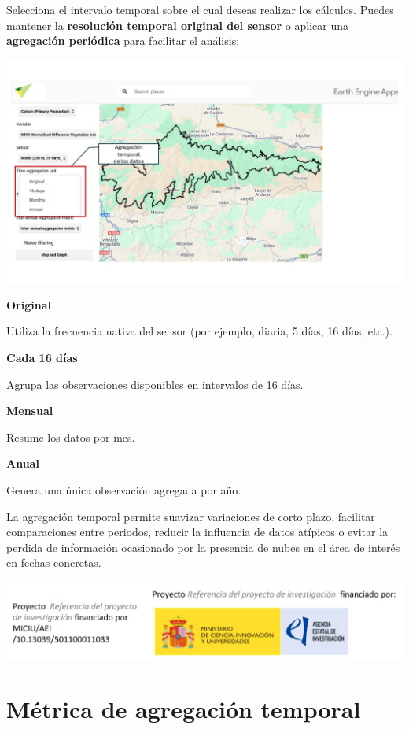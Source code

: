 \documentclass[
]{book}
\begin{document}
Selecciona el intervalo temporal sobre el cual deseas realizar los cálculos. Puedes mantener la \textbf{resolución temporal original del sensor} o aplicar una \textbf{agregación periódica} para facilitar el análisis:

\includegraphics{assets/aggregation_es.png}

\textbf{Original}

Utiliza la frecuencia nativa del sensor (por ejemplo, diaria, 5 días, 16 días, etc.).

\textbf{Cada 16 días}

Agrupa las observaciones disponibles en intervalos de 16 días.

\textbf{Mensual}

Resume los datos por mes.

\textbf{Anual}

Genera una única observación agregada por año.

La agregación temporal permite suavizar variaciones de corto plazo, facilitar
comparaciones entre periodos, reducir la influencia de datos atípicos o evitar la
perdida de información ocasionado por la presencia de nubes en el área de interés en
fechas concretas.

\includegraphics{assets/logo.jpeg}

\chapter{Métrica de agregación temporal}\label{agregacion-temporal}
\end{document}
